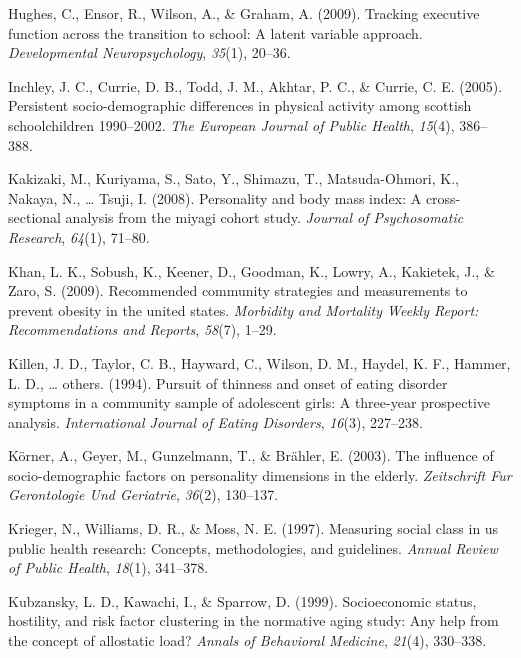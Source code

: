 \documentclass[man]{apa6}
\begin{document}
\leavevmode\hypertarget{ref-hughes2009tracking}{}%
Hughes, C., Ensor, R., Wilson, A., \& Graham, A. (2009). Tracking executive function across the transition to school: A latent variable approach. \emph{Developmental Neuropsychology}, \emph{35}(1), 20--36.

\leavevmode\hypertarget{ref-inchley2005persistent}{}%
Inchley, J. C., Currie, D. B., Todd, J. M., Akhtar, P. C., \& Currie, C. E. (2005). Persistent socio-demographic differences in physical activity among scottish schoolchildren 1990--2002. \emph{The European Journal of Public Health}, \emph{15}(4), 386--388.

\leavevmode\hypertarget{ref-kakizaki2008personality}{}%
Kakizaki, M., Kuriyama, S., Sato, Y., Shimazu, T., Matsuda-Ohmori, K., Nakaya, N., \ldots{} Tsuji, I. (2008). Personality and body mass index: A cross-sectional analysis from the miyagi cohort study. \emph{Journal of Psychosomatic Research}, \emph{64}(1), 71--80.

\leavevmode\hypertarget{ref-khan2009recommended}{}%
Khan, L. K., Sobush, K., Keener, D., Goodman, K., Lowry, A., Kakietek, J., \& Zaro, S. (2009). Recommended community strategies and measurements to prevent obesity in the united states. \emph{Morbidity and Mortality Weekly Report: Recommendations and Reports}, \emph{58}(7), 1--29.

\leavevmode\hypertarget{ref-killen1994pursuit}{}%
Killen, J. D., Taylor, C. B., Hayward, C., Wilson, D. M., Haydel, K. F., Hammer, L. D., \ldots{} others. (1994). Pursuit of thinness and onset of eating disorder symptoms in a community sample of adolescent girls: A three-year prospective analysis. \emph{International Journal of Eating Disorders}, \emph{16}(3), 227--238.

\leavevmode\hypertarget{ref-korner2003influence}{}%
Körner, A., Geyer, M., Gunzelmann, T., \& Brähler, E. (2003). The influence of socio-demographic factors on personality dimensions in the elderly. \emph{Zeitschrift Fur Gerontologie Und Geriatrie}, \emph{36}(2), 130--137.

\leavevmode\hypertarget{ref-krieger1997measuring}{}%
Krieger, N., Williams, D. R., \& Moss, N. E. (1997). Measuring social class in us public health research: Concepts, methodologies, and guidelines. \emph{Annual Review of Public Health}, \emph{18}(1), 341--378.

\leavevmode\hypertarget{ref-kubzansky1999socioeconomic}{}%
Kubzansky, L. D., Kawachi, I., \& Sparrow, D. (1999). Socioeconomic status, hostility, and risk factor clustering in the normative aging study: Any help from the concept of allostatic load? \emph{Annals of Behavioral Medicine}, \emph{21}(4), 330--338.
\end{document}

